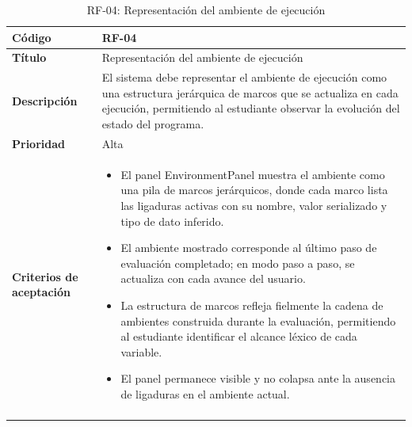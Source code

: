 \begin{longtable}{|>{\bfseries}p{3cm}|p{11cm}|}
\hline
\textbf{Código} & RF-04 \\
\hline
\textbf{Título} & Representación del ambiente de ejecución \\
\hline
\textbf{Descripción} & El sistema debe representar el ambiente de ejecución como una estructura jerárquica de marcos que se actualiza en cada ejecución, permitiendo al estudiante observar la evolución del estado del programa. \\
\hline
\textbf{Prioridad} & Alta \\
\hline
\textbf{Criterios de aceptación} &
\begin{itemize}[leftmargin=*,topsep=2pt,itemsep=1pt,parsep=0pt]
    \item El panel EnvironmentPanel muestra el ambiente como una pila de marcos jerárquicos, donde cada marco lista las ligaduras activas con su nombre, valor serializado y tipo de dato inferido.
    \item El ambiente mostrado corresponde al último paso de evaluación completado; en modo paso a paso, se actualiza con cada avance del usuario.
    \item La estructura de marcos refleja fielmente la cadena de ambientes construida durante la evaluación, permitiendo al estudiante identificar el alcance léxico de cada variable.
    \item El panel permanece visible y no colapsa ante la ausencia de ligaduras en el ambiente actual.
\end{itemize} \\
\hline
\caption{RF-04: Representación del ambiente de ejecución}
\label{tab:rf04}
\end{longtable}

